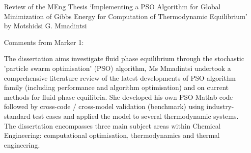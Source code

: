 \documentclass[14pt,twoside]{report}
\begin{document}
\clearpage



\bigskip

\begin{center}
  {\Large Review of the MEng Thesis `Implementing a PSO Algorithm for Global Minimization of Gibbs Energy for Computation of Thermodynamic Equilibrium' by Motshidsi G. Mmadintsi}
\end{center}

\noindent
    {\Large Comments from Marker 1:}

The dissertation aims investigate fluid phase equilibrium through the stochastic 'particle swarm optimisation' (PSO) algorithm, Ms Mmadintsi undertook a comprehensive literature review of the latest developments of PSO algorithm family (including performance and algorithm optimisation) and on current methods for fluid phase equilibria. She developed his own PSO Matlab code followed by cross-code / cross-model validation (benchmark) using industry-standard test cases and applied the model to several thermodynamic systems. The dissertation encompasses three main subject areas within Chemical Engineering: computational optimisation, thermodynamics and thermal engineering.
\end{document}
